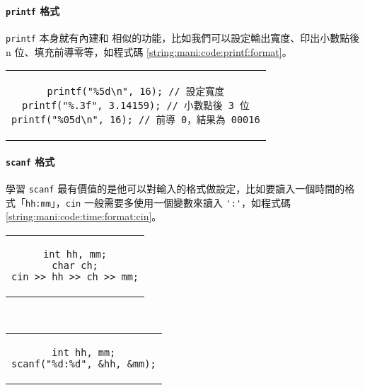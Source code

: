 \documentclass[12pt,a4paper,oneside]{report}
\begin{document}
\begin{CJK}{UTF8}{bkai}
\paragraph{\lstinline!printf! 格式}\lstinline!printf! 本身就有內建和  相似的功能，比如我們可以設定輸出寬度、印出小數點後 n 位、填充前導零等，如程式碼 \ref{string:mani:code:printf:format}。

\begin{code}
  \centering
  \begin{tabular}{c}
  \begin{lstlisting}
printf("%5d\n", 16); // 設定寬度
printf("%.3f", 3.14159); // 小數點後 3 位
printf("%05d\n", 16); // 前導 0，結果為 00016
  \end{lstlisting}
  \end{tabular}
  \caption{\lstinline!printf! 格式範例}
  \label{string:mani:code:printf:format}
\end{code}

\paragraph{\lstinline!scanf! 格式}學習 \lstinline!scanf! 最有價值的是他可以對輸入的格式做設定，比如要讀入一個時間的格式「\lstinline!hh:mm!」，\lstinline!cin! 一般需要多使用一個變數來讀入 \lstinline!':'!，如程式碼 \ref{string:mani:code:time:format:cin}。

\begin{code}[h!]
  \centering
  \begin{subcode}{.43\textwidth}
    \centering
    \begin{tabular}{c}
    \begin{lstlisting}
int hh, mm;
char ch;
cin >> hh >> ch >> mm;
    \end{lstlisting}
    \end{tabular}
    \caption{用 \lstinline!cin! 輸入}
    \label{string:mani:code:time:format:cin}
  \end{subcode}
  ~
  \begin{subcode}{.33\textwidth}
    \centering
    \begin{tabular}{c}
    \begin{lstlisting}
int hh, mm;
scanf("%d:%d", &hh, &mm);
    \end{lstlisting}
    \end{tabular}
    \caption{用 \lstinline!scanf! 輸入}
    \label{string:mani:code:time:format:scanf}
  \end{subcode}
  \caption{比較 \lstinline!cin! 與 \lstinline!scanf! 差異}
  \label{string:mani:code:time:format}
\end{code}


\end{CJK}
\end{document}
